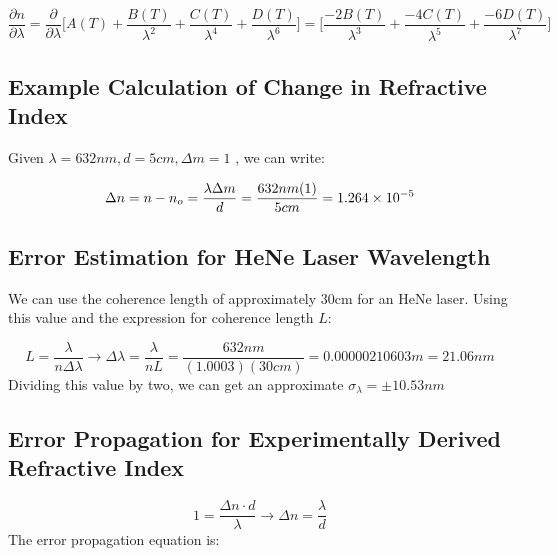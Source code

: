 \documentclass{article}
\begin{document}
\begin{equation}
\dfrac{\partial{n}}{\partial{\lambda}} = 
    \dfrac{\partial}{\partial{\lambda}}\bigg[   A(T) + \dfrac{B(T)}{\lambda^2}  + \dfrac{C(T)}{\lambda^4}   + \dfrac{D(T)}{\lambda^6}\bigg] =
    \bigg[   \dfrac{-2B(T)}{\lambda^3}  + \dfrac{-4C(T)}{\lambda^5}   + \dfrac{-6D(T)}{\lambda^7}\bigg]
\end{equation}
\subsection{ Example Calculation of Change in Refractive Index }\label{subsec:example_calculation_of_change_in_refractive_index}

Given $\lambda = 632nm, d = 5cm, \Delta{m} = 1$ , we can write:


\begin{equation}
	\Delta{n} =  n - n_o=\frac{\lambda\Delta{m}}{d} = \frac{632nm(1)}{5cm} = \num{1.264d-5}
\end{equation}



\clearpage

\subsection{ Error Estimation for HeNe Laser Wavelength }\label{subsec:error_estimation_for_hene_laser_wavelength}
We can use the coherence length of approximately 30cm for an HeNe laser. Using this value and the expression for coherence length $L$:

\begin{equation}
	L = \frac{\lambda}{n\Delta\lambda} \rightarrow \Delta\lambda = \frac{\lambda}{nL} = \frac{632nm}{(1.0003)(30cm)} = 0.00000210603m = 21.06nm
\end{equation}Dividing this value by two, we can get an approximate $\sigma_\lambda = \pm 10.53nm$ 




\subsection{ Error Propagation for Experimentally Derived Refractive Index }\label{subsec:error_propagation_for_experimentally_derived_refractive_index}

\begin{equation}
	1 = \frac{\Delta{n}\cdot d}{\lambda} \rightarrow \Delta{n} = \frac{\lambda}{d}
\end{equation}The error propagation equation is:
\end{document}
